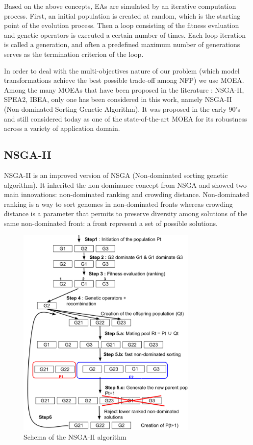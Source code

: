 \documentclass[conference]{IEEEtran}
\begin{document}
Based on the above concepts, EAs are simulated by an iterative computation process. First, an initial population is created at random, which is the starting point of the evolution process. Then a loop consisting of the fitness evaluation and genetic operators is executed a certain number of times. Each loop iteration is called a generation, and often a predefined maximum number of generations serves as the termination criterion of the loop.

In order to deal with the multi-objectives nature of our problem (which model transformations achieve the best possible trade-off among NFP) we use MOEA. 
Among the many MOEAs that have been proposed in the literature : NSGA-II\cite{Deb:2002:FEM:2221359.2221582}, SPEA2\cite{Zitzler01spea2:improving}, IBEA\cite{Zitzler04indicatorbasedselection}, only one has been considered in this work, namely NSGA-II (Non-dominated Sorting Genetic Algorithm). It was proposed in the early 90's and still considered today as one of the state-of-the-art MOEA for its robustness across a variety of application domain.

\subsection{NSGA-II}
NSGA-II is an improved version of NSGA\cite{Srinivas94multiobjectiveoptimization} (Non-dominated sorting genetic algorithm). It inherited the non-dominance concept from NSGA and showed two main innovations: non-dominated ranking and crowding distance. Non-dominated ranking is a way to sort genomes in non-dominated fronts whereas crowding distance is a parameter that permits to preserve diversity among solutions of the same non-dominated front: a front represent a set of possible solutions.

\begin{figure}[!ht]
\centering
\includegraphics[width=3.49in]{NSGAII.pdf}
\caption{Schema of the NSGA-II algorithm}
\label{nsgaii}
\end{figure}
\end{document}
